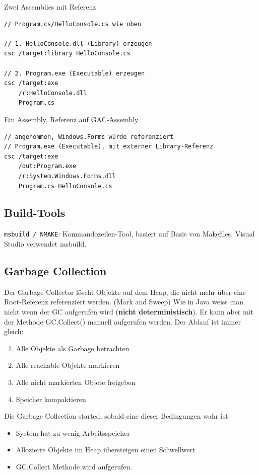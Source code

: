 \documentclass[
a4paper,
oneside,
10pt,
fleqn,
headsepline,
toc=listofnumbered, 
bibliography=totocnumbered]{scrartcl}
\begin{document}
Zwei Assemblies mit Referenz
\begin{lstlisting}
// Program.cs/HelloConsole.cs wie oben

// 1. HelloConsole.dll (Library) erzeugen
csc /target:library HelloConsole.cs

// 2. Program.exe (Executable) erzeugen
csc /target:exe
    /r:HelloConsole.dll
    Program.cs
\end{lstlisting}

Ein Assembly, Referenz auf GAC-Assembly
\begin{lstlisting}
// angenommen, Windows.Forms würde referenziert
// Program.exe (Executable), mit externer Library-Referenz
csc /target:exe
    /out:Program.exe
    /r:System.Windows.Forms.dll
    Program.cs HelloConsole.cs
\end{lstlisting}

\subsection{Build-Tools}
\lstinline|msbuild / NMAKE|: Kommandozeilen-Tool, basiert auf Basis von Makefiles. Visual Studio verwendet msbuild.

\subsection{Garbage Collection}
Der Garbage Collector löscht Objekte auf dem Heap, die nicht mehr über eine Root-Referenz referenziert werden. (Mark and Sweep) Wie in Java weiss man nicht wenn der GC aufgerufen wird (\textbf{nicht deterministisch}). Er kann aber mit der Methode GC.Collect() manuell aufgerufen werden. Der Ablauf ist immer gleich:
\begin{enumerate}
	\item Alle Objekte als Garbage betrachten
	\item Alle reachable Objekte markieren
	\item Alle nicht markierten Objete freigeben
	\item Speicher kompaktieren
\end{enumerate}

Die Garbage Collection started, sobald eine dieser Bedingungen wahr ist
\begin{itemize}
	\item System hat zu wenig Arbeitsspeicher
	\item Allozierte Objekte im Heap übersteigen einen Schwellwert
	\item GC.Collect Methode wird aufgerufen.
\end{itemize}
\end{document}

